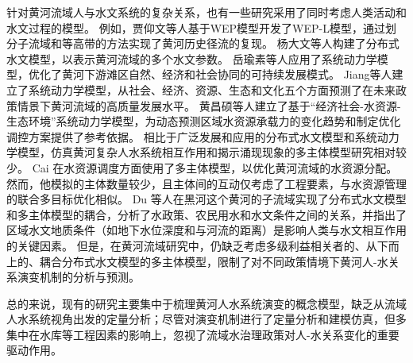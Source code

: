 针对黄河流域人与水文系统的复杂关系，也有一些研究采用了同时考虑人类活动和水文过程的模型。
例如，贾仰文等人基于WEP模型开发了WEP-L模型，通过划分子流域和等高带的方法实现了黄河历史径流的复现\cite{jiayangwen2005}。
杨大文等人构建了分布式水文模型，以表示黄河流域的多个水文参数\cite{yangdawen2004}。
岳瑜素等人应用了系统动力学模型，优化了黄河下游滩区自然、经济和社会协同的可持续发展模式\cite{yueyusu2020}。
Jiang等人建立了系统动力学模型，从社会、经济、资源、生态和文化五个方面预测了在未来政策情景下黄河流域的高质量发展水平\cite{jiang2021b}。
黄昌硕等人建立了基于“经济社会-水资源-生态环境”系统动力学模型，为动态预测区域水资源承载力的变化趋势和制定优化调控方案提供了参考依据\cite{huangchangshuo2021}。
相比于广泛发展和应用的分布式水文模型和系统动力学模型，仿真黄河复杂人水系统相互作用和揭示涌现现象的多主体模型研究相对较少。
Cai 在水资源调度方面使用了多主体模型，以优化黄河流域的水资源分配。然而，他模拟的主体数量较少，且主体间的互动仅考虑了工程要素，与水资源管理的联合多目标优化相似\cite{cai2011}。
Du 等人在黑河这个黄河的子流域实现了分布式水文模型和多主体模型的耦合，分析了水政策、农民用水和水文条件之间的关系，并指出了区域水文地质条件（如地下水位深度和与河流的距离）是影响人类与水文相互作用的关键因素\cite{du2020}。
但是，在黄河流域研究中，仍缺乏考虑多级利益相关者的、从下而上的、耦合分布式水文模型的多主体模型，限制了对不同政策情境下黄河人-水关系演变机制的分析与预测。

总的来说，现有的研究主要集中于梳理黄河人水系统演变的概念模型，缺乏从流域人水系统视角出发的定量分析；尽管对演变机制进行了定量分析和建模仿真，但多集中在水库等工程因素的影响上，忽视了流域水治理政策对人-水关系变化的重要驱动作用。
